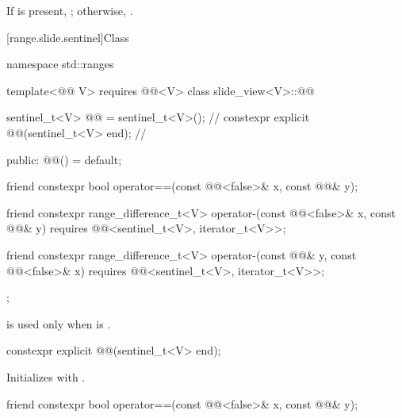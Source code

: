 \begin{itemdescr}
\pnum
\returns
If  is present,
;
otherwise, .
\end{itemdescr}

[range.slide.sentinel]{Class }

%
\begin{codeblock}
namespace std::ranges {
  template<@@ V>
    requires @@<V>
  class slide_view<V>::@@ {
    sentinel_t<V> @@ = sentinel_t<V>();             // \expos
    constexpr explicit @@(sentinel_t<V> end);   // \expos

  public:
    @@() = default;

    friend constexpr bool operator==(const @@<false>& x, const @@& y);

    friend constexpr range_difference_t<V>
      operator-(const @@<false>& x, const @@& y)
        requires @@<sentinel_t<V>, iterator_t<V>>;

    friend constexpr range_difference_t<V>
      operator-(const @@& y, const @@<false>& x)
        requires @@<sentinel_t<V>, iterator_t<V>>;
  };
}
\end{codeblock}

\pnum
\begin{note}
 is used
only when  is .
\end{note}

%
\begin{itemdecl}
constexpr explicit @@(sentinel_t<V> end);
\end{itemdecl}

\begin{itemdescr}
\pnum
\effects
Initializes  with .
\end{itemdescr}

%
\begin{itemdecl}
friend constexpr bool operator==(const @@<false>& x, const @@& y);
\end{itemdecl}

